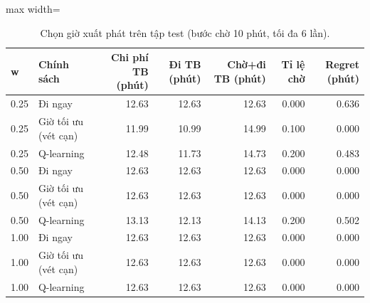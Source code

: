 \begin{table}[!htbp]
\centering
\small
\caption{Chọn giờ xuất phát trên tập test (bước chờ 10 phút, tối đa 6 lần).}
\label{tab:tab_departure}
\begin{adjustbox}{max width=\linewidth}
\begin{tabular}{llrrrrr}
\toprule
w & Chính sách & Chi phí TB (phút) & Đi TB (phút) & Chờ+đi TB (phút) & Tỉ lệ chờ & Regret (phút) \\
\midrule
0.25 & Đi ngay & 12.63 & 12.63 & 12.63 & 0.000 & 0.636 \\
0.25 & Giờ tối ưu (vét cạn) & 11.99 & 10.99 & 14.99 & 0.100 & 0.000 \\
0.25 & Q-learning & 12.48 & 11.73 & 14.73 & 0.200 & 0.483 \\
0.50 & Đi ngay & 12.63 & 12.63 & 12.63 & 0.000 & 0.000 \\
0.50 & Giờ tối ưu (vét cạn) & 12.63 & 12.63 & 12.63 & 0.000 & 0.000 \\
0.50 & Q-learning & 13.13 & 12.13 & 14.13 & 0.200 & 0.502 \\
1.00 & Đi ngay & 12.63 & 12.63 & 12.63 & 0.000 & 0.000 \\
1.00 & Giờ tối ưu (vét cạn) & 12.63 & 12.63 & 12.63 & 0.000 & 0.000 \\
1.00 & Q-learning & 12.63 & 12.63 & 12.63 & 0.000 & 0.000 \\
\bottomrule
\end{tabular}
\end{adjustbox}
\end{table}
